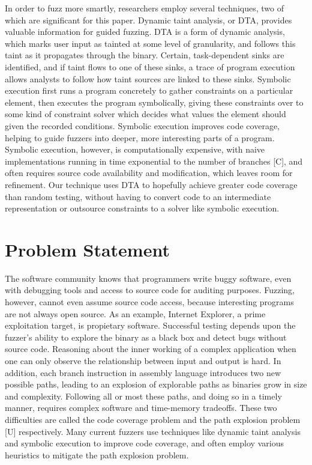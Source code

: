 \documentclass[11pt,expanded,copyright]{fsuthesis}
\begin{document}
In order to fuzz more smartly, researchers employ several techniques, two of which are significant for this paper. Dynamic taint analysis, or DTA, provides valuable information for guided fuzzing. DTA is a form of dynamic analysis, which marks user input as tainted at some level of granularity, and follows this taint as it propagates through the binary. Certain, task-dependent sinks are identified, and if taint flows to one of these sinks, a trace of program execution allows analysts to follow how taint sources are linked to these sinks. Symbolic execution first runs a program concretely to gather constraints on a particular element, then executes the program symbolically, giving these constraints over to some kind of constraint solver which decides what values the element should given the recorded conditions. Symbolic execution improves code coverage, helping to guide fuzzers into deeper, more interesting parts of a program. Symbolic execution, however, is computationally expensive, with naive implementations running in time exponential to the number of branches [C], and often requires source code availability and modification, which leaves room for refinement. Our technique uses DTA to hopefully achieve greater code coverage than random testing, without having to convert code to an intermediate representation or outsource constraints to a solver like symbolic execution.

\section{Problem Statement}

The software community knows that programmers write buggy software, even with debugging tools and access to source code for auditing purposes. Fuzzing, however, cannot even assume source code access, because interesting programs are not always open source. As an example, Internet Explorer, a prime exploitation target, is propietary software. Successful testing depends upon the fuzzer's ability to explore the binary as a black box and detect bugs without source code. Reasoning about the inner working of a complex application when one can only observe the relationship between input and output is hard. In addition, each branch instruction in assembly language introduces two new possible paths, leading to an explosion of explorable paths as binaries grow in size and complexity. Following all or most these paths, and doing so in a timely manner, requires complex software and time-memory tradeoffs. These two difficulties are called the code coverage problem and the path explosion problem [U] respectively. Many current fuzzers use techniques like dynamic taint analysis and symbolic execution to improve code coverage, and often employ various heuristics to mitigate the path explosion problem.
\end{document}
